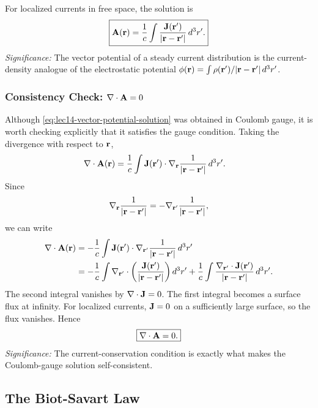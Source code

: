 For localized currents in free space, the solution is
\begin{equation}\label{eq:lec14-vector-potential-solution}
  \boxed{
    \mathbf{A}(\mathbf{r})=\frac{1}{c}\int
    \frac{\mathbf{J}(\mathbf{r}')}{|\mathbf{r}-\mathbf{r}'|}\,d^3r' .
  }
\end{equation}
\textit{Significance:} The vector potential of a steady current distribution is the
current-density analogue of the electrostatic potential
$\phi(\mathbf{r})=\int \rho(\mathbf{r}')/|\mathbf{r}-\mathbf{r}'|\,d^3r'$.

\subsubsection*{Consistency Check: \texorpdfstring{$\nabla \cdot\mathbf{A}=0$}{div A = 0}}
Although \eqref{eq:lec14-vector-potential-solution} was obtained in Coulomb gauge, it is
worth checking explicitly that it satisfies the gauge condition.  Taking the divergence
with respect to $\mathbf{r}$,
\begin{align}
  \nabla \cdot\mathbf{A}(\mathbf{r})
  &= \frac{1}{c}\int
     \mathbf{J}(\mathbf{r}')\cdot\nabla_{\mathbf{r}}\frac{1}{|\mathbf{r}-\mathbf{r}'|}\,d^3r' . \label{eq:lec14-divA-start}
\end{align}
Since
\begin{equation}\label{eq:lec14-grad-switch}
  \nabla_{\mathbf{r}}\frac{1}{|\mathbf{r}-\mathbf{r}'|}
  =-\nabla_{\mathbf{r}'}\frac{1}{|\mathbf{r}-\mathbf{r}'|},
\end{equation}
we can write
\begin{align}
  \nabla \cdot\mathbf{A}(\mathbf{r})
  &= -\frac{1}{c}\int
     \mathbf{J}(\mathbf{r}')\cdot\nabla_{\mathbf{r}'}\frac{1}{|\mathbf{r}-\mathbf{r}'|}\,d^3r' \notag\\
  &= -\frac{1}{c}\int
     \nabla_{\mathbf{r}'}\cdot
     \left(\frac{\mathbf{J}(\mathbf{r}')}{|\mathbf{r}-\mathbf{r}'|}\right)d^3r'
     +\frac{1}{c}\int
     \frac{\nabla_{\mathbf{r}'}\cdot\mathbf{J}(\mathbf{r}')}{|\mathbf{r}-\mathbf{r}'|}\,d^3r'. \label{eq:lec14-divA-product}
\end{align}
The second integral vanishes by $\nabla \cdot\mathbf{J}=0$.  The first integral becomes a surface
flux at infinity.  For localized currents, $\mathbf{J}=0$ on a sufficiently large surface,
so the flux vanishes.  Hence
\begin{equation}\label{eq:lec14-divA-zero}
  \boxed{\nabla \cdot\mathbf{A}=0.}
\end{equation}
\textit{Significance:} The current-conservation condition is exactly what makes the
Coulomb-gauge solution self-consistent.

\subsection{The Biot-Savart Law}\label{subsec:lec14-biot-savart}

